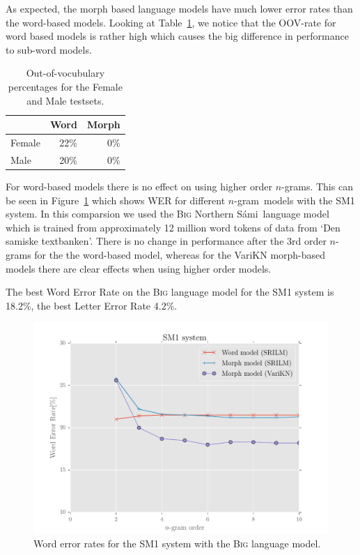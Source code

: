\documentclass[b5paper]{article}
\newcommand{\ns}{Northern Sámi}
\newcommand{\ngram}{$n$-gram}
\newcommand{\ds}[1]{\textsc{#1}}
\begin{document}
As expected, the morph based language models have much lower error rates than the word-based models. Looking at Table~\ref{tbl:samioov}, we notice that the OOV-rate for word based models is rather high which causes the big difference in performance to sub-word models. %

\begin{table}[!h]
\centering
\begin{tabular}{lrr}
& Word & Morph\\\hline
Female &  22\% & 0\% \\
Male & 20\% & 0\%\\
\end{tabular}
\caption{Out-of-vocubulary percentages for the Female and Male testsets. \label{tbl:samioov}}
\end{table}


For word-based models there is no effect on using higher order \ngram s. This can be seen in Figure~\ref{fig:samiperf}  which shows WER for different \ngram\ models with the SM1 system. In this comparsion we used the \ds{Big} \ns\ language model which is trained from approximately 12 million word tokens of data from `Den samiske textbanken'. There is no change in performance after the 3rd order \ngram s for the the word-based model, whereas for the VariKN morph-based models there are clear effects when using higher order models. 


The best Word Error Rate on the \ds{Big} language model for the SM1 system is 18.2\%, the best Letter Error Rate 4.2\%. 

\begin{figure}
\centering
\includegraphics[width=.87\textwidth]{figures/sme1}
\caption{Word error rates for the SM1 system with the \ds{Big} language model.}\label{fig:samiperf}

\end{figure}
\end{document}

